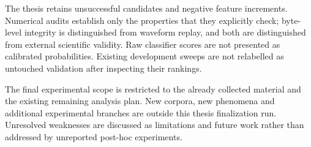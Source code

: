 The thesis retains unsuccessful candidates and negative feature increments.
Numerical audits establish only the properties that they explicitly check;
byte-level integrity is distinguished from waveform replay, and both are
distinguished from external scientific validity. Raw classifier scores are
not presented as calibrated probabilities. Existing development sweeps are
not relabelled as untouched validation after inspecting their rankings.

The final experimental scope is restricted to the already collected material
and the existing remaining analysis plan. New corpora, new phenomena and
additional experimental branches are outside this thesis finalization run.
Unresolved weaknesses are discussed as limitations and future work rather
than addressed by unreported post-hoc experiments.
